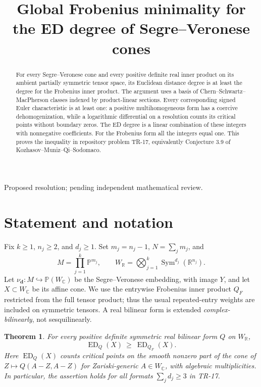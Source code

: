 \documentclass[11pt]{article}
\title{Global Frobenius minimality for the ED degree of Segre--Veronese cones}
\author{}
\date{}
\newtheorem{theorem}{Theorem}
\theoremstyle{remark}\newtheorem{remark}[theorem]{Remark}
\newcommand{\C}{\mathbb C}
\newcommand{\R}{\mathbb R}
\newcommand{\PP}{\mathbb P}
\newcommand{\ED}{\operatorname{ED}}
\begin{document}
\maketitle
\vspace{-2.5em}
\begin{center}\small Proposed resolution; pending independent mathematical review.\end{center}
\begin{abstract}
For every Segre--Veronese cone and every positive definite real inner product on its ambient partially symmetric tensor space, its Euclidean distance degree is at least the degree for the Frobenius inner product. The argument uses a basis of Chern--Schwartz--MacPherson classes indexed by product-linear sections. Every corresponding signed Euler characteristic is at least one: a positive multihomogeneous form has a coercive dehomogenization, while a logarithmic differential on a resolution counts its critical points without boundary zeros. The ED degree is a linear combination of these integers with nonnegative coefficients. For the Frobenius form all the integers equal one. This proves the inequality in repository problem TR-17, equivalently Conjecture 3.9 of Kozhasov--Muniz--Qi--Sodomaco.
\end{abstract}

\section{Statement and notation}
Fix $k\geq1$, $n_j\geq2$, and $d_j\geq1$. Set $m_j=n_j-1$, $N=\sum_jm_j$, and
\[
 M=\prod_{j=1}^k\PP^{m_j},\qquad
 W_{\R}=\bigotimes_{j=1}^k\operatorname{Sym}^{d_j}(\R^{n_j}).
\]
Let $\nu_{\mathbf d}:M\hookrightarrow\PP(W_{\C})$ be the Segre--Veronese embedding, with image $Y$, and let $X\subset W_{\C}$ be its affine cone. We use the entrywise Frobenius inner product $Q_F$ restricted from the full tensor product; thus the usual repeated-entry weights are included on symmetric tensors. A real bilinear form is extended \emph{complex-bilinearly}, not sesquilinearly.

\begin{theorem}\label{thm:main}
For every positive definite symmetric real bilinear form $Q$ on $W_{\R}$,
\[
 \boxed{\ED_Q(X)\ \geq\ \ED_{Q_F}(X).}
\]
Here $\ED_Q(X)$ counts critical points on the smooth nonzero part of the cone of $Z\mapsto Q(A-Z,A-Z)$ for Zariski-generic $A\in W_{\C}$, with algebraic multiplicities. In particular, the assertion holds for all formats $\sum_jd_j\geq3$ in TR-17.
\end{theorem}
\end{document}
